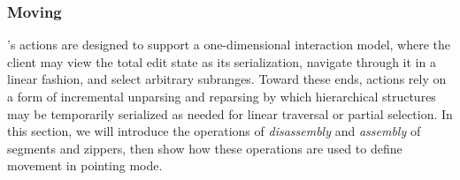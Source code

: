 


\subsubsection{Moving}

\ty's actions are designed to support
a one-dimensional interaction model, where the client may
view the total edit state as its serialization, navigate through it
in a linear fashion, and select arbitrary subranges.
Toward these ends, actions rely
on a form of incremental unparsing and reparsing by which
hierarchical structures may be temporarily serialized
as needed for linear traversal or partial selection.
In this section, we will introduce the operations of
\emph{disassembly} and \emph{assembly} of segments
and zippers, then show how these operations are used
to define movement in pointing mode.









